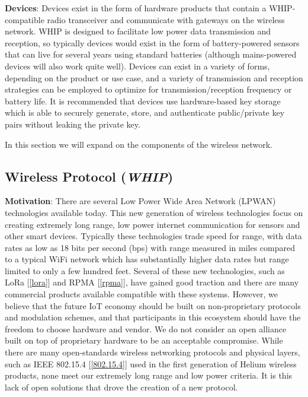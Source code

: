 \documentclass[letterpaper,11pt]{article}
\begin{document}
\textbf{Devices}: Devices exist in the form of hardware products that contain a WHIP-compatible radio transceiver and communicate with gateways on the wireless network. WHIP is designed to facilitate low power data transmission and reception, so typically devices would exist in the form of battery-powered sensors that can live for several years using standard batteries (although mains-powered devices will also work quite well). Devices can exist in a variety of forms, depending on the product or use case, and a variety of transmission and reception strategies can be employed to optimize for transmission/reception frequency or battery life. It is recommended that devices use hardware-based key storage which is able to securely generate, store, and authenticate public/private key pairs without leaking the private key.

In this section we will expand on the components of the wireless network.

\subsection{Wireless Protocol (\emph{WHIP})}\label{whip}

\textbf{Motivation}: There are several Low Power Wide Area Network (LPWAN) technologies available today. This new generation of wireless technologies focus on creating extremely long range, low power internet communication for sensors and other smart devices. Typically these technologies trade speed for range, with data rates as low as 18 bits per second (bps) with range measured in miles compared to a typical WiFi network which has substantially higher data rates but range limited to only a few hundred feet. Several of these new technologies, such as LoRa [\ref{lora}] and RPMA [\ref{rpma}], have gained good traction and there are many commercial products available compatible with these systems. However, we believe that the future IoT economy should be built on non-proprietary protocols and modulation schemes, and that participants in this ecosystem should have the freedom to choose hardware and vendor. We do not consider an open alliance built on top of proprietary hardware to be an acceptable compromise. While there are many open-standards wireless networking protocols and physical layers, such as IEEE 802.15.4 [\ref{802.15.4}] used in the first generation of Helium wireless products, none meet our extremely long range and low power criteria. It is this lack of open solutions that drove the creation of a new protocol.
\end{document}
